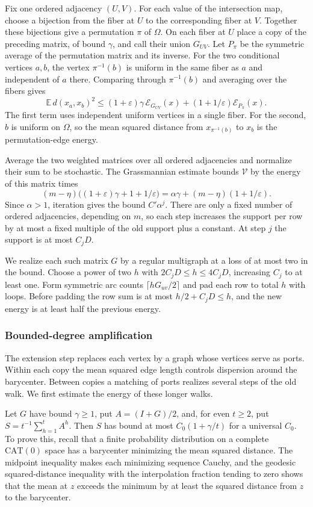 Fix one ordered adjacency $(U,V)$. For each value of the intersection
map, choose a bijection from the fiber at $U$ to the corresponding fiber
at $V$. Together these bijections give a permutation $\pi$ of $\Omega$.
On each fiber at $U$ place a copy of the preceding matrix, of bound
$\gamma$, and call their union $G_{UV}$. Let $P_\pi$ be the symmetric
average of the permutation matrix and its inverse. For the two conditional
vertices $a,b$, the vertex $\pi^{-1}(b)$ is uniform in the same fiber
as $a$ and independent of $a$ there. Comparing through $\pi^{-1}(b)$
and averaging over the fibers gives
\[
 \mathbb E\,d(x_a,x_b)^2\le
 (1+\varepsilon)\gamma\,\mathcal E_{G_{UV}}(x)
 +(1+1/\varepsilon)\mathcal E_{P_\pi}(x).
\]
The first term uses independent uniform vertices in a single fiber.
For the second, $b$ is uniform on $\Omega$, so the mean squared
distance from $x_{\pi^{-1}(b)}$ to $x_b$ is the permutation-edge energy.

Average the two weighted matrices over all ordered adjacencies and
normalize their sum to be stochastic. The Grassmannian estimate bounds
$\mathcal V$ by the energy of this matrix times
\[
 (m-\eta)\bigl((1+\varepsilon)\gamma+1+1/\varepsilon\bigr)
 =\alpha\gamma+(m-\eta)(1+1/\varepsilon).
\]
Since $\alpha>1$, iteration gives the bound $C'\alpha^j$. There are
only a fixed number of ordered adjacencies, depending on $m$, so each
step increases the support per row by at most a fixed multiple of the
old support plus a constant. At step $j$ the support is at most $C_jD$.

We realize each such matrix $G$ by a regular multigraph at a loss of
at most two in the bound. Choose a power of two $h$ with
$2C_jD\le h\le4C_jD$, increasing $C_j$ to at least one. Form symmetric
arc counts $\lceil h G_{uv}/2\rceil$ and pad each row to total $h$ with
loops. Before padding the row sum is at most $h/2+C_jD\le h$, and the new
energy is at least half the previous energy.

\subsubsection{Bounded-degree amplification}
The extension step replaces each vertex by a graph whose vertices
serve as ports. Within each copy the mean squared edge length controls
dispersion around the barycenter. Between copies a matching of ports realizes several steps of
the old walk. We first estimate the energy of these longer walks.

Let $G$ have bound $\gamma\ge1$,
put $A=(I+G)/2$, and, for even $t\ge2$, put $S=t^{-1}\sum_{h=1}^t A^h$.
Then $S$ has bound at most $C_0(1+\gamma/t)$ for a universal $C_0$.
To prove this, recall that a finite probability distribution on a complete
$\mathrm{CAT}(0)$ space has a barycenter minimizing the mean squared
distance. The midpoint inequality makes each minimizing sequence Cauchy, and
the geodesic squared-distance inequality with the interpolation fraction
tending to zero shows that the mean at $z$ exceeds the minimum by at
least the squared distance from $z$ to the barycenter.

